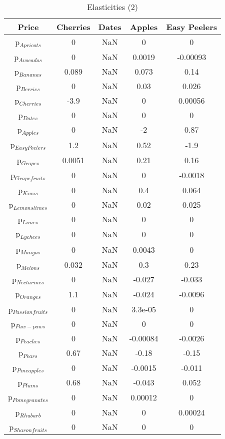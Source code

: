 \documentclass[11pt]{article}
\begin{document}
\begin{table}[h]
\caption{Elasticities (2)}
\label{Table: elasticities 2}
\begin{center}
\begin{tabular}{ccccc}
Price & Cherries & Dates & Apples & Easy Peelers \\ \hline
p$_{Apricots}$ & 0 & NaN & 0 & 0 \\ 
p$_{Avocados}$ & 0 & NaN & 0.0019 & -0.00093 \\ 
p$_{Bananas}$ & 0.089 & NaN & 0.073 & 0.14 \\ 
p$_{Berries}$ & 0 & NaN & 0.03 & 0.026 \\ 
p$_{Cherries}$ & -3.9 & NaN & 0 & 0.00056 \\ 
p$_{Dates}$ & 0 & NaN & 0 & 0 \\ 
p$_{Apples}$ & 0 & NaN & -2 & 0.87 \\ 
p$_{Easy Peelers}$ & 1.2 & NaN & 0.52 & -1.9 \\ 
p$_{Grapes}$ & 0.0051 & NaN & 0.21 & 0.16 \\ 
p$_{Grapefruits}$ & 0 & NaN & 0 & -0.0018 \\ 
p$_{Kiwis}$ & 0 & NaN & 0.4 & 0.064 \\ 
p$_{Lemonslimes}$ & 0 & NaN & 0.02 & 0.025 \\ 
p$_{Limes}$ & 0 & NaN & 0 & 0 \\ 
p$_{Lychees}$ & 0 & NaN & 0 & 0 \\ 
p$_{Mangos}$ & 0 & NaN & 0.0043 & 0 \\ 
p$_{Melons}$ & 0.032 & NaN & 0.3 & 0.23 \\ 
p$_{Nectarines}$ & 0 & NaN & -0.027 & -0.033 \\ 
p$_{Oranges}$ & 1.1 & NaN & -0.024 & -0.0096 \\ 
p$_{Passion fruits}$ & 0 & NaN & 3.3e-05 & 0 \\ 
p$_{Paw-paws}$ & 0 & NaN & 0 & 0 \\ 
p$_{Peaches}$ & 0 & NaN & -0.00084 & -0.0026 \\ 
p$_{Pears}$ & 0.67 & NaN & -0.18 & -0.15 \\ 
p$_{Pineapples}$ & 0 & NaN & -0.0015 & -0.011 \\ 
p$_{Plums}$ & 0.68 & NaN & -0.043 & 0.052 \\ 
p$_{Pomegranates}$ & 0 & NaN & 0.00012 & 0 \\ 
p$_{Rhubarb}$ & 0 & NaN & 0 & 0.00024 \\ 
p$_{Sharon fruits}$ & 0 & NaN & 0 & 0 \\ 
\end{tabular}
\end{center}
\end{table}
\end{document}
